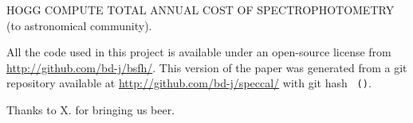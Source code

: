 \documentclass[12pt, letterpaper, preprint]{aastex}
\begin{document}
HOGG COMPUTE TOTAL ANNUAL COST OF SPECTROPHOTOMETRY (to astronomical community).

All the code used in this project is available under an open-source license
  from \url{http://github.com/bd-j/bsfh/}.
This version of the paper was generated
  from a git repository available at \url{http://github.com/bd-j/speccal/}
  with git hash \texttt{\githash\,(\gitdate)}.

\acknowledgements
Thanks to X. for bringing us beer.
\end{document}
